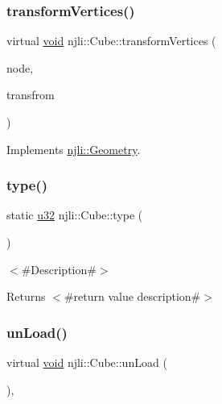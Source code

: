 \subsubsection{\texorpdfstring{transform\+Vertices()}{transformVertices()}}
{\footnotesize\ttfamily virtual \mbox{\hyperlink{_thread_8h_af1e856da2e658414cb2456cb6f7ebc66}{void}} njli\+::\+Cube\+::transform\+Vertices (\begin{DoxyParamCaption}\item[{\mbox{\hyperlink{classnjli_1_1_node}{Node}} $\ast$}]{node,  }\item[{const bt\+Transform \&}]{transfrom }\end{DoxyParamCaption})\hspace{0.3cm}{\ttfamily [virtual]}}



Implements \mbox{\hyperlink{classnjli_1_1_geometry_a25fefe3f656bdcb8c88d2fd4d2f48df1}{njli\+::\+Geometry}}.

\mbox{\label{classnjli_1_1_cube_a97051b1445b3ff0a8d394ba4d550c451}} 
\subsubsection{\texorpdfstring{type()}{type()}}
{\footnotesize\ttfamily static \mbox{\hyperlink{_util_8h_a10e94b422ef0c20dcdec20d31a1f5049}{u32}} njli\+::\+Cube\+::type (\begin{DoxyParamCaption}{ }\end{DoxyParamCaption})\hspace{0.3cm}{\ttfamily [static]}}

$<$\#\+Description\#$>$

\begin{DoxyReturn}{Returns}
$<$\#return value description\#$>$ 
\end{DoxyReturn}
\mbox{\label{classnjli_1_1_cube_a6699821443ee652912052b4d8ddf58e1}} 
\subsubsection{\texorpdfstring{un\+Load()}{unLoad()}}
{\footnotesize\ttfamily virtual \mbox{\hyperlink{_thread_8h_af1e856da2e658414cb2456cb6f7ebc66}{void}} njli\+::\+Cube\+::un\+Load (\begin{DoxyParamCaption}{ }\end{DoxyParamCaption})\hspace{0.3cm}{\ttfamily [protected]}, {\ttfamily [virtual]}}



